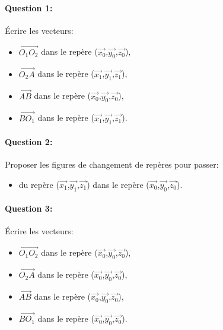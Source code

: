 \paragraph{Question 1:}

Écrire les vecteurs:
\begin{itemize}
 \item $\overrightarrow{O_1O_2}$ dans le repère ($\overrightarrow{x_0}$,$\overrightarrow{y_0}$,$\overrightarrow{z_0}$),
 \item $\overrightarrow{O_2A}$ dans le repère ($\overrightarrow{x_1}$,$\overrightarrow{y_1}$,$\overrightarrow{z_1}$),
 \item $\overrightarrow{AB}$ dans le repère ($\overrightarrow{x_0}$,$\overrightarrow{y_0}$,$\overrightarrow{z_0}$),
 \item $\overrightarrow{BO_1}$ dans le repère ($\overrightarrow{x_1}$,$\overrightarrow{y_1}$,$\overrightarrow{z_1}$).
\end{itemize}

\paragraph{Question 2:}

Proposer les figures de changement de repères pour passer:
\begin{itemize}
 \item du repère ($\overrightarrow{x_1}$,$\overrightarrow{y_1}$,$\overrightarrow{z_1}$) dans le repère ($\overrightarrow{x_0}$,$\overrightarrow{y_0}$,$\overrightarrow{z_0}$).
\end{itemize}

\paragraph{Question 3:}

Écrire les vecteurs:
\begin{itemize}
 \item $\overrightarrow{O_1O_2}$ dans le repère ($\overrightarrow{x_0}$,$\overrightarrow{y_0}$,$\overrightarrow{z_0}$),
 \item $\overrightarrow{O_2A}$ dans le repère ($\overrightarrow{x_0}$,$\overrightarrow{y_0}$,$\overrightarrow{z_0}$),
 \item $\overrightarrow{AB}$ dans le repère ($\overrightarrow{x_0}$,$\overrightarrow{y_0}$,$\overrightarrow{z_0}$),
 \item $\overrightarrow{BO_1}$ dans le repère ($\overrightarrow{x_0}$,$\overrightarrow{y_0}$,$\overrightarrow{z_0}$).
\end{itemize}

